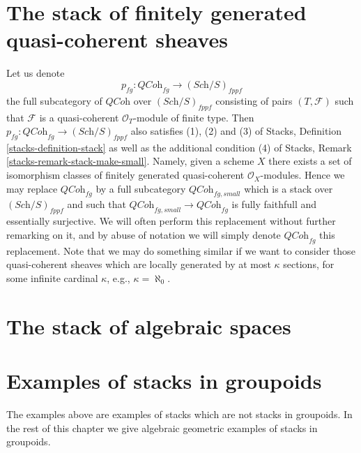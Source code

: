 \section{The stack of finitely generated quasi-coherent sheaves}
\label{section-stack-of-finitely-generated-quasi-coherent-sheaves}

\noindent
Let us denote
$$
p_{fg} : \textit{QCoh}_{fg} \to (\textit{Sch}/S)_{fppf}
$$
the full subcategory of $\textit{QCoh}$ over $(\textit{Sch}/S)_{fppf}$ 
consisting of pairs $(T, \mathcal{F})$ such that $\mathcal{F}$
is a quasi-coherent $\mathcal{O}_T$-module of finite type. Then
$p_{fg} : \textit{QCoh}_{fg} \to (\textit{Sch}/S)_{fppf}$
also satisfies (1), (2) and (3) of
Stacks, Definition \ref{stacks-definition-stack}
as well as the additional condition (4) of
Stacks, Remark \ref{stacks-remark-stack-make-small}.
Namely, given a scheme $X$ there exists a set of isomorphism classes
of finitely generated quasi-coherent $\mathcal{O}_X$-modules.
Hence we may replace $\textit{QCoh}_{fg}$ by a full subcategory
$\textit{QCoh}_{fg, small}$
which is a stack over $(\textit{Sch}/S)_{fppf}$ and such that
$\textit{QCoh}_{fg, small} \to \textit{QCoh}_{fg}$ is
fully faithfull and essentially surjective.
We will often perform this replacement without further
remarking on it, and by abuse of notation we will simply denote
$\textit{QCoh}_{fg}$ this replacement. Note that we may do
something similar if we want to consider those quasi-coherent sheaves
which are locally generated by at most $\kappa$ sections, for some
infinite cardinal $\kappa$, e.g., $\kappa = \aleph_0$.





\section{The stack of algebraic spaces}
\label{section-stack-of-spaces}











\section{Examples of stacks in groupoids}
\label{section-examples-stacks}

\noindent
The examples above are examples of stacks which are not stacks in
groupoids. In the rest of this chapter we give
algebraic geometric examples of stacks in groupoids.



